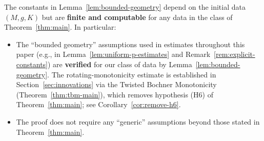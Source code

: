\begin{remark}
The constants in Lemma~\ref{lem:bounded-geometry} depend on the initial data $(M, g, K)$ but are \textbf{finite and computable} for any data in the class of Theorem~\ref{thm:main}. In particular:
\begin{itemize}
    \item The ``bounded geometry'' assumptions used in estimates throughout this paper (e.g., in Lemma~\ref{lem:uniform-p-estimates} and Remark~\ref{rem:explicit-constants}) are \textbf{verified} for our class of data by Lemma~\ref{lem:bounded-geometry}. The rotating-monotonicity estimate is established in Section~\ref{sec:innovations} via the Twisted Bochner Monotonicity (Theorem~\ref{thm:tbm-main}), which removes hypothesis (H6) of Theorem~\ref{thm:main}; see Corollary~\ref{cor:remove-h6}.
    \item The proof does not require any ``generic'' assumptions beyond those stated in Theorem~\ref{thm:main}.
\end{itemize}
\end{remark}

